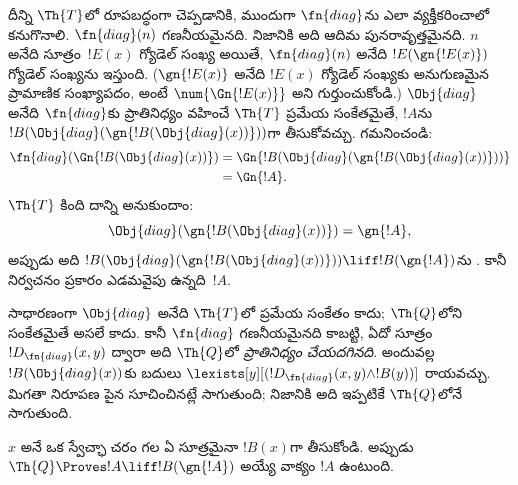 \documentclass[../../../include/open-logic-section]{subfiles}
\begin{document}
\begin{explain}
దీన్ని $\Th{T}$లో రూపబద్ధంగా చెప్పడానికి, ముందుగా $\fn{diag}$ను ఎలా
వ్యక్తీకరించాలో కనుగొనాలి. $\fn{diag}(n)$ గణనీయమైనది. నిజానికి అది ఆదిమ
పునరావృత్తమైనది.
$n$ అనేది సూత్రం~$!E(x)$ గ్యోడెల్ సంఖ్య అయితే, $\fn{diag}(n)$ అనేది
$!E(\gn{!E(x)})$ గ్యోడెల్ సంఖ్యను ఇస్తుంది. ($\gn{!E(x)}$ అనేది
$!E(x)$ గ్యోడెల్ సంఖ్యకు అనుగుణమైన ప్రామాణిక సంఖ్యాపదం, అంటే $\num{\Gn{!E(x)}}$ అని
గుర్తుంచుకోండి.) $\Obj{diag}$ అనేది $\fn{diag}$కు ప్రాతినిధ్యం వహించే
$\Th{T}$ ప్రమేయ సంకేతమైతే, $!A$ను
$!B(\Obj{diag}(\gn{!B(\Obj{diag}(x))}))$గా తీసుకోవచ్చు. గమనించండి:
\begin{align*}
\fn{diag}(\Gn{!B(\Obj{diag}(x))}) & =
\Gn{!B(\Obj{diag}(\gn{!B(\Obj{diag}(x))}))} \\
& = \Gn{!A}.
\end{align*}
$\Th{T}$ కింది దాన్ని  అనుకుందాం:
\[
\Obj{diag}(\gn{!B(\Obj{diag}(x))}) = \gn{!A},
\]
అప్పుడు అది $!B(\Obj{diag}(\gn{!B(\Obj{diag}(x))}))
\liff !B(\gn{!A})$ను . కానీ నిర్వచనం ప్రకారం ఎడమవైపు
ఉన్నది~$!A$.

సాధారణంగా $\Obj{diag}$ అనేది $\Th{T}$లో ప్రమేయ సంకేతం కాదు; $\Th{Q}$లోని
సంకేతమైతే అసలే కాదు. కానీ $\fn{diag}$ గణనీయమైనది కాబట్టి, ఏదో సూత్రం
$!D_{\fn{diag}}(x,y)$ ద్వారా అది $\Th{Q}$లో \emph{ప్రాతినిధ్యం చేయదగినది}.
అందువల్ల $!B(\Obj{diag}(x))$కు బదులు
$\lexists[y][(!D_{\fn{diag}}(x,y) \land !B(y))]$ రాయవచ్చు. మిగతా నిరూపణ
పైన సూచించినట్లే సాగుతుంది; నిజానికి అది ఇప్పటికే $\Th{Q}$లోనే సాగుతుంది.
\end{explain}

\begin{lem}
 $x$ అనే ఒక స్వేచ్ఛా చరం గల ఏ సూత్రమైనా $!B(x)$గా
తీసుకోండి. అప్పుడు $\Th{Q} \Proves !A \liff !B(\gn{!A})$ అయ్యే వాక్యం
$!A$ ఉంటుంది.
\end{lem}
\end{document}
